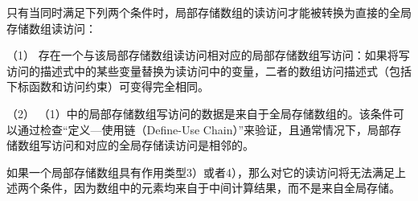 只有当同时满足下列两个条件时，局部存储数组的读访问才能被转换为直接的全局存储数组读访问：
\begin{compactitem}
\item[（1）]{存在一个与该局部存储数组读访问相对应的局部存储数组写访问：如果将写访问的描述式中的某些变量替换为读访问中的变量，二者的数组访问描述式（包括下标函数和访问约束）可变得完全相同。}
\item[（2）]{（1）中的局部存储数组写访问的数据是来自于全局存储数组的。该条件可以通过检查``定义—使用链（Define-Use Chain）''来验证，且通常情况下，局部存储数组写访问和对应的全局存储读访问是相邻的。}
\end{compactitem}
如果一个局部存储数组具有作用类型3）或者4），那么对它的读访问将无法满足上述两个条件，因为数组中的元素均来自于中间计算结果，而不是来自全局存储。

